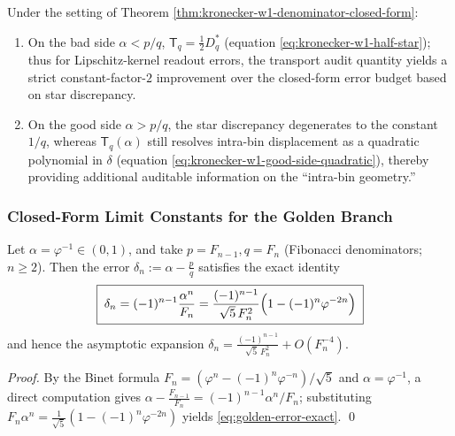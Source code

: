 \begin{corollary}\label{cor:kronecker-w1-two-sided-interpretation}
Under the setting of Theorem \ref{thm:kronecker-w1-denominator-closed-form}:
\begin{enumerate}
  \item On the bad side \(\alpha<p/q\), \(\mathsf{T}_q=\tfrac12 D_q^\ast\) (equation \eqref{eq:kronecker-w1-half-star}); thus for Lipschitz-kernel readout errors, the transport audit quantity yields a strict constant-factor-$2$ improvement over the closed-form error budget based on star discrepancy.
  \item On the good side \(\alpha>p/q\), the star discrepancy degenerates to the constant \(1/q\), whereas \(\mathsf{T}_q(\alpha)\) still resolves intra-bin displacement as a quadratic polynomial in \(\delta\) (equation \eqref{eq:kronecker-w1-good-side-quadratic}), thereby providing additional auditable information on the ``intra-bin geometry.''
\end{enumerate}
\end{corollary}

\subsubsection{Closed-Form Limit Constants for the Golden Branch}\label{subsec:kronecker-w1-golden}

\begin{lemma}\label{lem:golden-convergent-error-closed}
Let \(\alpha=\varphi^{-1}\in(0,1)\), and take \(p=F_{n-1},q=F_n\) (Fibonacci denominators; \(n\ge 2\)).
Then the error \(\delta_n:=\alpha-\frac pq\) satisfies the exact identity
\begin{equation}\label{eq:golden-error-exact}
\boxed{\;
\delta_n=(-1)^{n-1}\frac{\alpha^n}{F_n}
=\frac{(-1)^{n-1}}{\sqrt5\,F_n^2}\Bigl(1-(-1)^n\varphi^{-2n}\Bigr)\;}
\end{equation}
and hence the asymptotic expansion \(\delta_n=\frac{(-1)^{n-1}}{\sqrt5\,F_n^2}+O(F_n^{-4})\).
\end{lemma}
\begin{proof}
By the Binet formula \(F_n=(\varphi^n-(-1)^n\varphi^{-n})/\sqrt5\) and \(\alpha=\varphi^{-1}\), a direct computation gives
\(
\alpha-\frac{F_{n-1}}{F_n}=(-1)^{n-1}\alpha^n/F_n
\);
substituting \(F_n\alpha^n=\frac{1}{\sqrt5}(1-(-1)^n\varphi^{-2n})\) yields \eqref{eq:golden-error-exact}. \qed
\end{proof}

